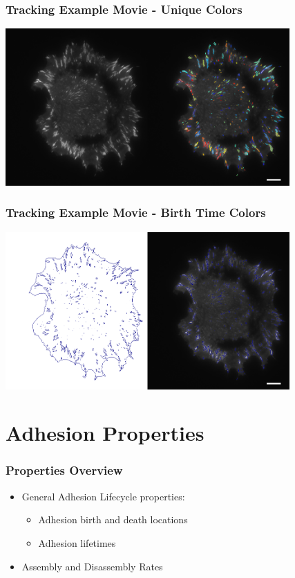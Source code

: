 \documentclass{beamer}
\begin{document}
\begin{frame}
	\frametitle{Tracking Example Movie - Unique Colors}
	\begin{center}
	\includegraphics[width=10.88cm]{figures/finding/orig_track_sample}
	\end{center}
\end{frame}

\begin{frame}
	\frametitle{Tracking Example Movie - Birth Time Colors}
	\begin{center}
	\includegraphics[width=10.88cm]{figures/finding/time_track_sample}
	\end{center}
\end{frame}

\section[Properties]{Adhesion Properties}

\begin{frame}
	\frametitle{Properties Overview}
	\begin{itemize}
	\item General Adhesion Lifecycle properties:
		\begin{itemize}
		\item Adhesion birth and death locations
		\item Adhesion lifetimes
		\end{itemize}
	\item Assembly and Disassembly Rates
	\end{itemize}
\end{frame}
\end{document}
